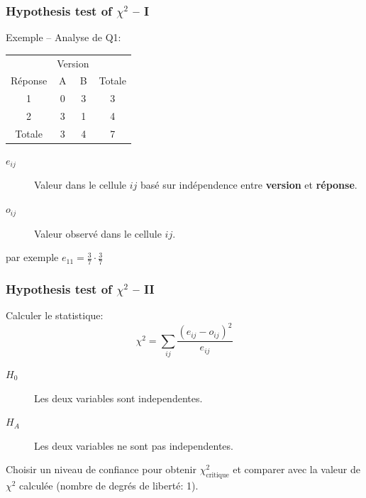 \documentclass{beamer}
\begin{document}
\begin{frame}
  \frametitle{Hypothesis test of $\chi^2$ -- I}
Exemple -- Analyse de Q1:


\begin{center}
\begin{tabular}{c|cc|c}
   & \multicolumn{2}{c|}{Version} &  \\ 
  Réponse  & A & B & Totale \\ \hline
  1 & 0 & 3 & 3 \\
  2 & 3 & 1 & 4 \\ \hline
  Totale & 3 & 4 & 7
\end{tabular}
\end{center}

\begin{description}
\item [$e_{ij}$] Valeur dans le cellule ${ij}$ basé sur indépendence entre
  {\bf version} et {\bf réponse}.
\item [$o_{ij}$] Valeur observé dans le cellule ${ij}$.
\end{description}

par exemple $e_{11} = \frac{3}{7} \cdot \frac{3}{7}$
\end{frame}

\begin{frame}
\frametitle{Hypothesis test of $\chi^2$ -- II}

Calculer le statistique:
\[
\chi^2 = \sum_{ij} \frac{(e_{ij}-o_{ij})^2}{e_{ij}}
\]

  \begin{description}
  \item[$H_0$] Les deux variables sont independentes. 
  \item[$H_A$] Les deux variables ne sont pas independentes.
  \end{description}

  Choisir un niveau de confiance pour obtenir $\chi^2_{\text{critique}}$ et comparer avec
  la valeur de $\chi^2$ calculée (nombre de degrés de liberté: 1). 
\end{frame}
\end{document}
